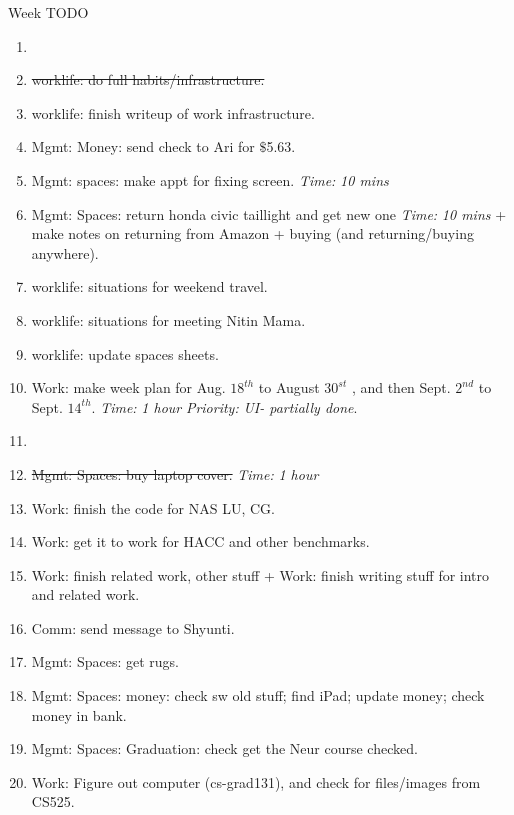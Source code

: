 \documentclass[serif, mathserif, final]{beamer}
\newcommand{\doneTask}[1]{\item \sout{#1}}
\newcommand{\timeEst}[1]{\textit{Time:} \textit{#1}}
\newcommand{\priority}[1]{\textit{Priority:} \textit{#1}}
\begin{document}
\begin{frame}{}
\begin{columns}
\begin{column}{0.50\linewidth}
\begin{block}{ Week TODO}
\begin{enumerate}
\item \tiny \doneTask{worklife: do full habits/infrastructure.} 
\item \tiny worklife: finish writeup of work infrastructure. 

\item \tiny Mgmt: Money: send check to Ari for $\$$5.63. 
\item \tiny Mgmt: spaces: make appt for fixing screen. \timeEst{10 mins}  
\item \tiny Mgmt: Spaces: return honda civic taillight and get new one \timeEst{10 mins}  + make notes on returning from Amazon + buying  (and returning/buying anywhere). 
\item \tiny worklife: situations for weekend travel. 
\item \tiny worklife: situations for meeting Nitin Mama. 
\tiny \item \tiny worklife: update spaces sheets.
\item \tiny Work: make week plan for Aug. $18^{th}$ to August $30^{st}$ , and then Sept. $2^{nd}$ to Sept. $14^{th}$. \timeEst{1 hour} \priority{UI- partially done}. 
\item \tiny \doneTask{Mgmt: Spaces: buy laptop cover.} \timeEst{1 hour} 

\item \tiny Work: finish the code for NAS LU, CG. 
\item \tiny Work: get it to work for HACC and other benchmarks. 
\item \tiny Work: finish related work, other stuff + Work: finish writing stuff for intro and related work. 

\item \tiny Comm: send message to Shyunti. 
\item \tiny Mgmt: Spaces: get rugs. 
\item \tiny Mgmt: Spaces: money: check sw old stuff; find iPad; update money; check money in bank. 
\item \tiny Mgmt: Spaces: Graduation: check get the Neur course checked. 

\item \tiny Work: Figure out computer (cs-grad131), and check for files/images from CS525. 


\end{enumerate}
\end{block}
\end{column}
\end{columns}
\end{frame}
\end{document}
